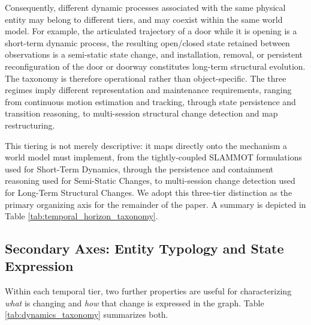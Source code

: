 Consequently, different dynamic processes associated with the same physical entity may belong to different tiers, and may coexist within the same world model. 
For example, the articulated trajectory of a door while it is opening is a short-term dynamic process, the resulting open/closed state retained between observations is a semi-static state change, and installation, removal, or persistent reconfiguration of the door or doorway constitutes long-term structural evolution.
The taxonomy is therefore operational rather than object-specific. The three regimes imply different representation and maintenance requirements, ranging from continuous motion estimation and tracking, through state persistence and transition reasoning, to multi-session structural change detection and map restructuring.


This tiering is not merely descriptive: it maps directly onto the mechanism a world model must implement, from the tightly-coupled SLAMMOT formulations used for Short-Term Dynamics, through the persistence and containment reasoning used for Semi-Static Changes, to multi-session change detection used for Long-Term Structural Changes. 
We adopt this three-tier distinction as the primary organizing axis for the remainder of the paper.
A summary is depicted in Table \ref{tab:temporal_horizon_taxonomy}.

\subsection{Secondary Axes: Entity Typology and State Expression}\label{sec:taxonomy_secondary_axes}
Within each temporal tier, two further properties are useful for characterizing \textit{what} is changing and \textit{how} that change is expressed in the graph. 
Table \ref{tab:dynamics_taxonomy} summarizes both.

